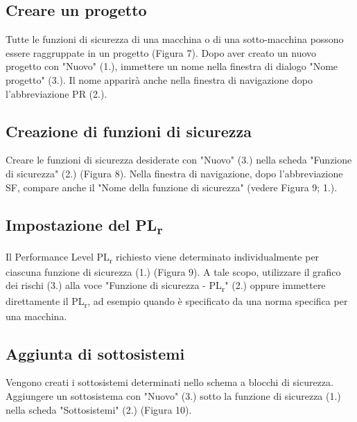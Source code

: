 \documentclass[a4paper,11pt]{article}
\begin{document}
    \subsection{Creare un progetto} %
    \par\medskip\noindent Tutte le funzioni di sicurezza di una macchina o di una sotto-macchina possono essere raggruppate in un progetto (Figura 7). Dopo aver creato un nuovo progetto con "Nuovo" (1.), immettere un nome nella finestra di dialogo "Nome progetto" (3.). Il nome apparirà anche nella finestra di navigazione dopo l'abbreviazione PR (2.).

    \subsection{Creazione di funzioni di sicurezza} %
    Creare le funzioni di sicurezza desiderate con "Nuovo" (3.) nella scheda "Funzione di sicurezza" (2.) (Figura 8). Nella finestra di navigazione, dopo l'abbreviazione SF, compare anche il "Nome della funzione di sicurezza" (vedere Figura 9; 1.).
    
    \subsection{Impostazione del PL\textsubscript{r}}   %
    Il Performance Level PL\textsubscript{r} richiesto viene determinato individualmente per ciascuna funzione di sicurezza (1.) (Figura 9). A tale scopo, utilizzare il grafico dei rischi (3.) alla voce "Funzione di sicurezza - PL\textsubscript{r}" (2.) oppure immettere direttamente il PL\textsubscript{r}, ad esempio quando è specificato da una norma specifica per una macchina.

    \subsection{Aggiunta di sottosistemi} %
    Vengono creati i sottosistemi determinati nello schema a blocchi di sicurezza. Aggiungere un sottosistema con "Nuovo" (3.) sotto la funzione di sicurezza (1.) nella scheda "Sottosistemi" (2.) (Figura 10).
\end{document}
